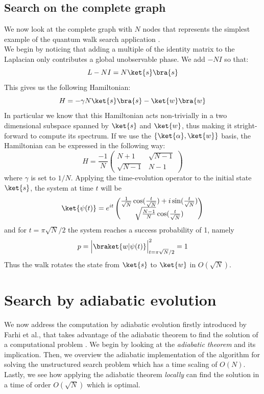 \subsection{Search on the complete graph}\label{subsec:search qw complete graph}
We now look at the complete graph with $N$ nodes that represents the simplest example of the quantum walk search application \cite{Childs2004}. \\We begin by noticing that adding a multiple of the identity matrix to the Laplacian only contributes a global unobservable phase. We add $-NI$ so that:
\begin{equation}
  L - NI = N\ket{s}\bra{s}
\end{equation}
This gives us the following Hamiltonian:
\begin{equation}
  H = -\gamma N\ket{s}\bra{s} - \ket{w}\bra{w}
\end{equation}
In particular we know that this Hamiltonian acts non-trivially in a two dimensional subspace spanned by $\ket{s}$ and $\ket{w}$, thus making it stright-forward to compute its spectrum. If we use the $\{\ket{\alpha}, \ket{w}\}$ basis, the Hamiltonian can be expressed in the following way:
\begin{equation}
  H = \frac{-1}{N} \begin{pmatrix} N+1 & \sqrt{N-1}\\ \sqrt{N-1} & N-1 \end{pmatrix}
\end{equation}
where $\gamma$ is set to $1/N$.
Applying the time-evolution operator to the initial state $\ket{s}$, the system at time $t$ will be
\begin{equation}
  \ket{\psi(t)} = e^{it}
  \begin{pmatrix}
  \frac{1}{\sqrt{N}}\cos(\frac{t}{\sqrt{N}}) +i\sin(\frac{t}{\sqrt{N}})\\
  \sqrt{\frac{N-1}{N}}\cos(\frac{t}{\sqrt{N}})
  \end{pmatrix}
  \label{eq:qw_state_ref}
\end{equation}
and for $t=\pi\sqrt{N}/2$ the system reaches a success probability of 1, namely
\begin{equation}
  p = \Big|\braket{w|\psi(t)}\Big|^2_{t=\pi\sqrt{N}/2} = 1
\end{equation}
Thus the walk rotates the state from $\ket{s}$ to $\ket{w}$ in $O(\sqrt{N})$.

\section{Search by adiabatic evolution}\label{sec:adiabatic evolution}
We now address the computation by adiabatic evolution firstly introduced by Farhi et al., that takes advantage of the adiabatic theorem to find the solution of a computational problem \cite{Farhi2000}. We begin by looking at the \textit{adiabatic theorem} and its implication. Then, we overview the adiabatic implementation of the algorithm for solving the unstructured search problem which has a time scaling of $O(N)$. Lastly, we see how applying the adiabatic theorem \textit{locally} can find the solution in a time of order $O(\sqrt{N})$ which is optimal.

